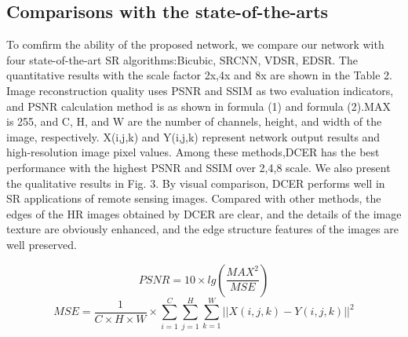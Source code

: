 \documentclass[runningheads,a4paper]{llncs}
\begin{document}
\subsection{Comparisons with the state-of-the-arts}
To comfirm the ability of the proposed network, we compare our network with four state-of-the-art SR algorithms:Bicubic, SRCNN\cite{Dong2014Learning}, VDSR\cite{Kim2015Accurate}, EDSR\cite{Lim2017Enhanced}. The quantitative results with the scale factor 2x,4x and 8x are shown in the Table 2. Image reconstruction quality uses PSNR and SSIM as two evaluation indicators, and PSNR calculation method is as shown in formula (1) and formula (2).MAX is 255, and C, H, and W are the number of channels, height, and width of the image, respectively. X(i,j,k) and Y(i,j,k) represent network output results and high-resolution image pixel values. Among these methods,DCER has the best performance with the highest PSNR and SSIM over 2,4,8 scale. We
also present the qualitative results in Fig. 3. By visual comparison, DCER performs well in SR applications of remote sensing images. Compared with other methods, the edges of the HR images obtained by DCER are clear, and the details of the image texture are obviously enhanced, and the edge structure features of the images are well preserved.
\begin{small}
\begin{equation}
  PSNR = 10\times lg(\frac{MAX^2}{MSE})
\end{equation}
\begin{equation}
  MSE = \frac{1}{C\times H\times W}\times\sum_{i=1}^C\sum_{j=1}^H\sum_{k=1}^W \left ||X(i,j,k)-Y(i,j,k) \right ||^2
\end{equation}
\end{small}
\end{document}

